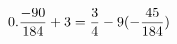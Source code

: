 \documentclass[preview]{standalone}
\begin{document}
\begin{align*}
\special{dvisvgm:raw <g id='unique000'>}0.\frac{-90}{184} + 3 = \frac{3}{4} - 9(- \frac{45}{184})\special{dvisvgm:raw </g>}
\end{align*}
\end{document}
